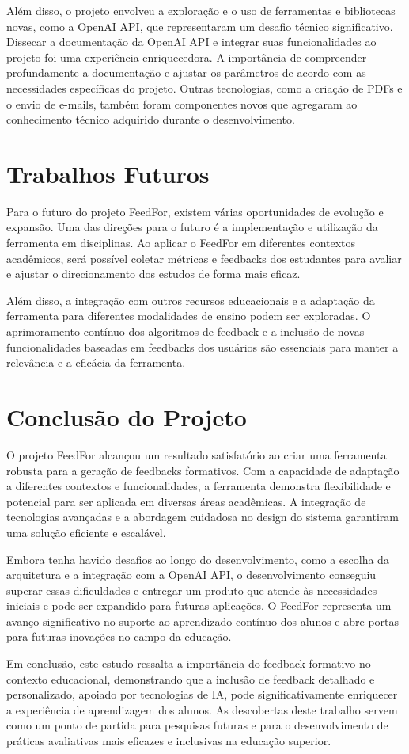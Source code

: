 Além disso, o projeto envolveu a exploração e o uso de ferramentas e bibliotecas novas, como a OpenAI API, que representaram um desafio técnico significativo. Dissecar a documentação da OpenAI API e integrar suas funcionalidades ao projeto foi uma experiência enriquecedora. A importância de compreender profundamente a documentação e ajustar os parâmetros de acordo com as necessidades específicas do projeto. Outras tecnologias, como a criação de PDFs e o envio de e-mails, também foram componentes novos que agregaram ao conhecimento técnico adquirido durante o desenvolvimento.

\section{Trabalhos Futuros}

Para o futuro do projeto FeedFor, existem várias oportunidades de evolução e expansão. Uma das direções para o futuro é a implementação e utilização da ferramenta em disciplinas. Ao aplicar o FeedFor em diferentes contextos acadêmicos, será possível coletar métricas e feedbacks dos estudantes para avaliar e ajustar o direcionamento dos estudos de forma mais eficaz.

Além disso, a integração com outros recursos educacionais e a adaptação da ferramenta para diferentes modalidades de ensino podem ser exploradas. O aprimoramento contínuo dos algoritmos de feedback e a inclusão de novas funcionalidades baseadas em feedbacks dos usuários são essenciais para manter a relevância e a eficácia da ferramenta.

\section{Conclusão do Projeto}

O projeto FeedFor alcançou um resultado satisfatório ao criar uma ferramenta robusta para a geração de feedbacks formativos. Com a capacidade de adaptação a diferentes contextos e funcionalidades, a ferramenta demonstra flexibilidade e potencial para ser aplicada em diversas áreas acadêmicas. A integração de tecnologias avançadas e a abordagem cuidadosa no design do sistema garantiram uma solução eficiente e escalável.

Embora tenha havido desafios ao longo do desenvolvimento, como a escolha da arquitetura e a integração com a OpenAI API, o desenvolvimento conseguiu superar essas dificuldades e entregar um produto que atende às necessidades iniciais e pode ser expandido para futuras aplicações. O FeedFor representa um avanço significativo no suporte ao aprendizado contínuo dos alunos e abre portas para futuras inovações no campo da educação.

Em conclusão, este estudo ressalta a importância do feedback formativo no contexto educacional, demonstrando que a inclusão de feedback detalhado e personalizado, apoiado por tecnologias de IA, pode significativamente enriquecer a experiência de aprendizagem dos alunos. As descobertas deste trabalho servem como um ponto de partida para pesquisas futuras e para o desenvolvimento de práticas avaliativas mais eficazes e inclusivas na educação superior.